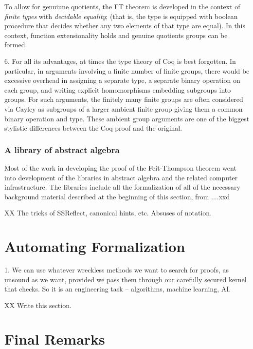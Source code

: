 \documentclass[brochure,english,12pt]{bourbaki}
\theoremstyle{plain}
\begin{document}
To allow for genuiune quotients, the FT theorem is developed in the context of {\it finite types} with {\it decidable equality};
(that is, the type is equipped with boolean procedure that decides whether any two elements of that type are equal).
In this context, function extensionality holds and genuine quotients groups can be formed.


6.  For all its advantages, at times the type theory of Coq is best forgotten.  In particular,
in arguments involving a finite number of finite groups, there would be excessive overhead in
assigning a separate type, a separate binary operation on each group, 
and writing explicit homomorphisms embedding subgroups into groups.
 For such arguments, the finitely many finite groups are
often considered via Cayley as subgroups of a larger ambient finite group giving them a common binary
operation and type.  These ambient group arguments are one of the biggest stylistic differences
between the Coq proof and the original.


\subsubsection{A library of abstract algebra}

Most of the work in developing the proof of the Feit-Thompson theorem went into development of the libraries in
abstract algebra and the related computer infrastructure.  The libraries include all the formalization of all
of the necessary background material described at the beginning of this section, from ....xxd




XX The tricks of SSReflect, canonical hints, etc.  Absuses of notation.



\section{Automating Formalization}

1. We can use whatever wreckless methods we want to search for proofs, as unsound as we want,
provided we pass them through our carefully secured kernel that checks.
So it is an engineering task -- algorithms, machine learning, AI.

XX Write this section.


\section{Final Remarks}
\end{document}
